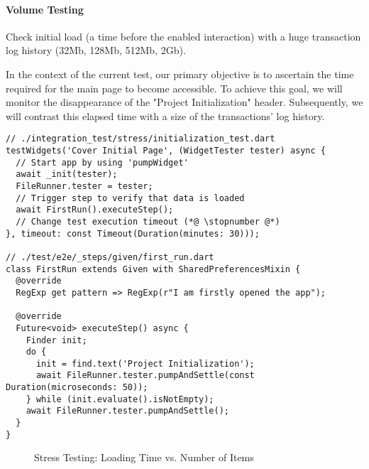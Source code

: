 \paragraph{Volume Testing}
Check initial load (a time before the enabled interaction) with a huge transaction log history (32Mb, 128Mb, 
512Mb, 2Gb).

In the context of the current test, our primary objective is to ascertain the time required for the main page to 
become accessible. To achieve this goal, we will monitor the disappearance of the "Project Initialization" header. 
Subsequently, we will contrast this elapsed time with a size of the transactions' log history.

\begin{lstlisting}
// ./integration_test/stress/initialization_test.dart
testWidgets('Cover Initial Page', (WidgetTester tester) async {
  // Start app by using 'pumpWidget'
  await _init(tester);
  FileRunner.tester = tester;
  // Trigger step to verify that data is loaded
  await FirstRun().executeStep();
  // Change test execution timeout (*@ \stopnumber @*)
}, timeout: const Timeout(Duration(minutes: 30)));

// ./test/e2e/_steps/given/first_run.dart
class FirstRun extends Given with SharedPreferencesMixin {
  @override
  RegExp get pattern => RegExp(r"I am firstly opened the app");

  @override
  Future<void> executeStep() async {
    Finder init;
    do {
      init = find.text('Project Initialization');
      await FileRunner.tester.pumpAndSettle(const Duration(microseconds: 50));
    } while (init.evaluate().isNotEmpty);
    await FileRunner.tester.pumpAndSettle();
  }
}
\end{lstlisting}

\begin{figure}
\caption{Stress Testing: Loading Time vs. Number of Items} \label{t-stress}
\end{figure}

